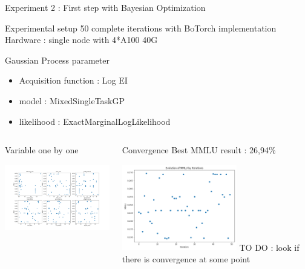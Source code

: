 \begin{frame}[allowframebreaks]{Experiment 2 : First step with Bayesian Optimization}
    \begin{block}{Experimental setup}
        50 complete iterations with BoTorch implementation\\
        Hardware : single node with 4*A100 40G
    \end{block}

    \begin{block}{Gaussian Process parameter}
    \begin{itemize}
        \item Acquisition function : Log EI
        \item model : MixedSingleTaskGP
        \item likelihood : ExactMarginalLogLikelihood
    \end{itemize}
        
    \end{block}

    \framebreak
    
    \begin{columns}
    
        \begin{column}[t]{0.6\textwidth}
            \begin{block}{Variable one by one}
            
                \includegraphics[width = 7.5cm]{imgs/exp2-bo_individual.png}
            
            \end{block}   
        \end{column}

        \begin{column}[t]{0.4\textwidth}
            \begin{block}{Convergence}
            Best MMLU result : 26,94\%
            
        \includegraphics[width = 5cm]{imgs/exp2-bo_mmlu.png}
        TO DO : look if there is convergence at some point
            

\end{block}
\end{column}
\end{columns}
\end{frame}
